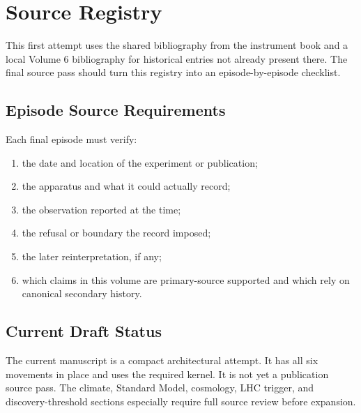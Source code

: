 \chapter{Source Registry}
\label{chap:source-registry}

This first attempt uses the shared bibliography from the instrument book and a
local Volume 6 bibliography for historical entries not already present there.
The final source pass should turn this registry into an episode-by-episode
checklist.

\section*{Episode Source Requirements}

Each final episode must verify:

\begin{enumerate}
\item the date and location of the experiment or publication;
\item the apparatus and what it could actually record;
\item the observation reported at the time;
\item the refusal or boundary the record imposed;
\item the later reinterpretation, if any;
\item which claims in this volume are primary-source supported and which rely
on canonical secondary history.
\end{enumerate}

\section*{Current Draft Status}

The current manuscript is a compact architectural attempt. It has all six
movements in place and uses the required  kernel. It is not yet a
publication source pass. The climate, Standard Model, cosmology, LHC trigger,
and discovery-threshold sections especially require full source review before
expansion.

